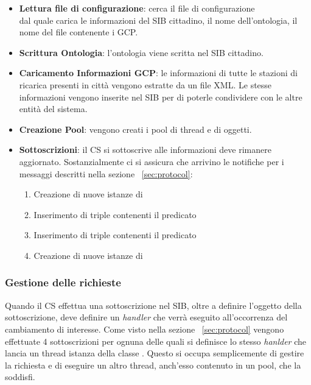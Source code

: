 \begin{itemize}
	\item \textbf{Lettura file di configurazione}: cerca il file di configurazione \\  dal quale carica le informazioni del SIB cittadino, il nome dell'ontologia, il nome del file contenente i GCP.
	\item \textbf{Scrittura Ontologia}: l'ontologia viene scritta nel SIB cittadino.
	\item \textbf{Caricamento Informazioni GCP}: le informazioni di tutte le stazioni di ricarica presenti in città vengono estratte da un file XML. Le stesse informazioni vengono inserite nel SIB per di poterle condividere con le altre entità del sistema.
	\item \textbf{Creazione Pool}: vengono creati i pool di thread e di oggetti.
	\item \label{item:subscr} \textbf{Sottoscrizioni}: il CS si sottoscrive alle informazioni deve rimanere aggiornato. Sostanzialmente ci si assicura che arrivino le notifiche per i messaggi descritti nella sezione ~\ref{sec:protocol}:
	\begin{enumerate}
		\item Creazione di nuove istanze di 
		\item Inserimento di triple contenenti il predicato 
		\item Inserimento di triple contenenti il predicato 
		\item Creazione di nuove istanze di 
	\end{enumerate}
\end{itemize}

\subsubsection{Gestione delle richieste}

Quando il CS effettua una sottoscrizione nel SIB, oltre a definire l'oggetto della sottoscrizione, deve definire un \emph{handler} che verrà eseguito all'occorrenza del cambiamento di interesse. Come visto nella sezione ~\ref{sec:protocol} vengono effettuate 4 sottoscrizioni per ognuna delle quali si definisce lo stesso \emph{hanlder} che lancia un thread istanza della classe . Questo si occupa semplicemente di gestire la richiesta e di eseguire un altro thread, anch'esso contenuto in un pool, che la soddisfi.

